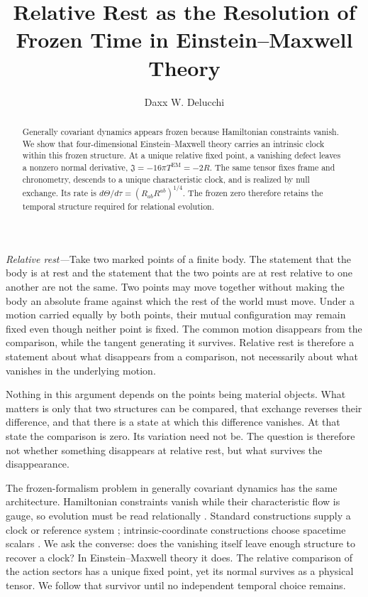 \documentclass[aps,prl,reprint]{revtex4-2}
\newcommand{\EM}{\mathrm{EM}}
\begin{document}
\title{Relative Rest as the Resolution of Frozen Time in Einstein--Maxwell Theory}

\author{Daxx W. Delucchi}

\begin{abstract}
Generally covariant dynamics appears frozen because Hamiltonian constraints vanish. We show that four-dimensional Einstein--Maxwell theory carries an intrinsic clock within this frozen structure. At a unique relative fixed point, a vanishing defect leaves a nonzero normal derivative, $\mathfrak J=-16\pi T^{\EM}=-2R$. The same tensor fixes frame and chronometry, descends to a unique characteristic clock, and is realized by null exchange. Its rate is $d\Theta/d\tau=(R_{ab}R^{ab})^{1/4}$. The frozen zero therefore retains the temporal structure required for relational evolution.
\end{abstract}

\maketitle

\textit{Relative rest---}Take two marked points of a finite body. The statement that the body is at rest and the statement that the two points are at rest relative to one another are not the same. Two points may move together without making the body an absolute frame against which the rest of the world must move. Under a motion carried equally by both points, their mutual configuration may remain fixed even though neither point is fixed. The common motion disappears from the comparison, while the tangent generating it survives. Relative rest is therefore a statement about what disappears from a comparison, not necessarily about what vanishes in the underlying motion.

Nothing in this argument depends on the points being material objects. What matters is only that two structures can be compared, that exchange reverses their difference, and that there is a state at which this difference vanishes. At that state the comparison is zero. Its variation need not be. The question is therefore not whether something disappears at relative rest, but what survives the disappearance.

The frozen-formalism problem in generally covariant dynamics has the same architecture. Hamiltonian constraints vanish while their characteristic flow is gauge, so evolution must be read relationally \cite{Rovelli,Dittrich,Anderson,Isham}. Standard constructions supply a clock or reference system \cite{BrownKuchar,HoehnVanrietvelde}; intrinsic-coordinate constructions choose spacetime scalars \cite{PonsSalisbury}. We ask the converse: does the vanishing itself leave enough structure to recover a clock? In Einstein--Maxwell theory it does. The relative comparison of the action sectors has a unique fixed point, yet its normal survives as a physical tensor. We follow that survivor until no independent temporal choice remains.
\end{document}
